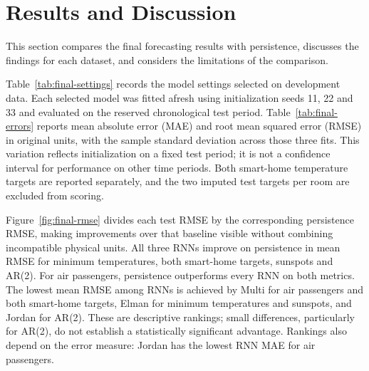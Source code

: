 \section{Results and Discussion}
\label{sec:results}

This section compares the final forecasting results with persistence, discusses
the findings for each dataset, and considers the limitations of the comparison.

Table~\ref{tab:final-settings} records the model settings selected on
development data. Each selected model was fitted afresh using initialization
seeds 11, 22 and 33 and evaluated on the reserved chronological test period.
Table~\ref{tab:final-errors} reports mean absolute error (MAE) and root mean
squared error (RMSE) in original units, with the sample standard deviation
across those three fits. This variation reflects initialization on a fixed test
period; it is not a confidence interval for performance on other time periods.
Both smart-home temperature targets are reported separately, and the two imputed
test targets per room are excluded from scoring.




Figure~\ref{fig:final-rmse} divides each test RMSE by the corresponding
persistence RMSE, making improvements over that baseline visible without
combining incompatible physical units. All three RNNs improve on persistence in
mean RMSE for minimum temperatures, both smart-home targets, sunspots and AR(2).
For air passengers, persistence outperforms every RNN on both metrics. The
lowest mean RMSE among RNNs is achieved by Multi for air passengers and both
smart-home targets, Elman for minimum temperatures and sunspots, and Jordan for
AR(2). These are descriptive rankings; small differences, particularly for
AR(2), do not establish a statistically significant advantage. Rankings also
depend on the error measure: Jordan has the lowest RNN MAE for air passengers.

